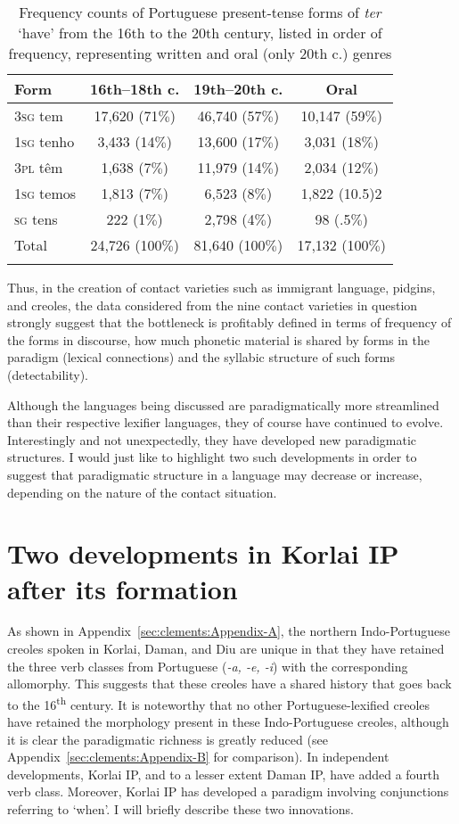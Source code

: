 \documentclass[output=paper,colorlinks,citecolor=brown]{langscibook}
\begin{document}
\begin{table}
\caption{Frequency counts of Portuguese present-tense forms of \textit{ter} ‘have’ from the 16th to the 20th century, listed in order of frequency, representing written and oral (only 20th c.) genres \label{tab:clements:extra1}}
\begin{tabular}{lccc}
\lsptoprule
{Form}& {16th–18th c.} & {19th–20th c.} & {Oral}\\\midrule
3\textsc{sg} tem  & 17,620 (71$\%$) & 46,740 (57$\%$) & 10,147 (59$\%$)\\
1\textsc{sg} tenho & 3,433 (14$\%$) & 13,600 (17$\%$)& 3,031 (18$\%$)\\
3\textsc{pl} têm & 1,638 (7$\%$)& 11,979 (14$\%$) & 2,034 (12$\%$)\\
1\textsc{sg} temos & 1,813 (7$\%$) & 6,523 (8$\%$) & 1,822 (10.5)2\\
\textsc{sg} tens & 222 (1$\%$) & 2,798 (4$\%$) & 98 (.5$\%$)\\\midrule
{Total}          &  24,726 (100$\%$) & 81,640 (100$\%$) & 17,132 (100$\%$) \\
\lspbottomrule
\end{tabular}
\end{table}


Thus, in the creation of contact varieties such as immigrant language, pidgins, and creoles, the data considered from the nine contact varieties in question strongly suggest that the bottleneck is profitably defined in terms of frequency of the forms in discourse, how much phonetic material is shared by forms in the paradigm (lexical connections) and the syllabic structure of such forms (detectability).


Although the languages being discussed are paradigmatically more streamlined than their respective lexifier languages, they of course have continued to evolve. Interestingly and not unexpectedly, they have developed new paradigmatic structures. I would just like to highlight two such developments in order to suggest that paradigmatic structure in a language may decrease or increase, depending on the nature of the contact situation.


\section{Two developments in Korlai IP after its formation}

As shown in Appendix~\ref{sec:clements:Appendix-A}, the northern Indo-Portuguese creoles spoken in Korlai, Daman, and Diu are unique in that they have retained the three verb classes from Portuguese (\textit{-a, -e, -i}) with the corresponding allomorphy. This suggests that these creoles have a shared history that goes back to the 16\textsuperscript{th} century. It is noteworthy that no other Portuguese-lexified creoles have retained the morphology present in these Indo-Portuguese creoles, although it is
clear the paradigmatic richness is greatly reduced (see Appendix~\ref{sec:clements:Appendix-B} for comparison). In independent developments, Korlai IP, and to a lesser extent Daman IP, have added a fourth verb class. Moreover, Korlai IP has developed a paradigm involving conjunctions referring to `when'. I will briefly describe these two innovations.
\end{document}
